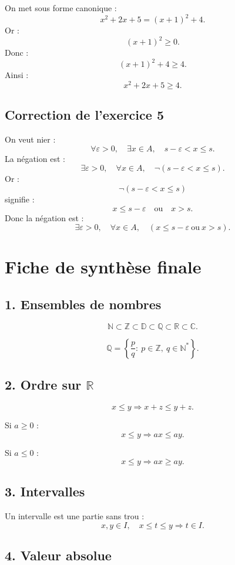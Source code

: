 \documentclass[11pt,a4paper]{article}
\newcommand{\N}{\mathbb N}
\newcommand{\Z}{\mathbb Z}
\newcommand{\D}{\mathbb D}
\newcommand{\Q}{\mathbb Q}
\newcommand{\R}{\mathbb R}
\newcommand{\C}{\mathbb C}
\newcommand{\implique}{\Longrightarrow}
\begin{document}
On met sous forme canonique :
\[
x^2+2x+5=(x+1)^2+4.
\]
Or :
\[
(x+1)^2\geq0.
\]
Donc :
\[
(x+1)^2+4\geq4.
\]
Ainsi :
\[
x^2+2x+5\geq4.
\]

\subsection*{Correction de l'exercice 5}

On veut nier :
\[
\forall \varepsilon>0,\quad \exists x\in A,\quad s-\varepsilon<x\leq s.
\]
La négation est :
\[
\exists \varepsilon>0,\quad \forall x\in A,\quad \neg(s-\varepsilon<x\leq s).
\]
Or :
\[
\neg(s-\varepsilon<x\leq s)
\]
signifie :
\[
x\leq s-\varepsilon
\quad\text{ou}\quad
x>s.
\]
Donc la négation est :
\[
\exists \varepsilon>0,\quad \forall x\in A,\quad
\left(x\leq s-\varepsilon\ \text{ou}\ x>s\right).
\]

\newpage
\section{Fiche de synthèse finale}

\subsection*{1. Ensembles de nombres}

\[
\N\subset\Z\subset\D\subset\Q\subset\R\subset\C.
\]

\[
\Q=\left\{\frac pq:\ p\in\Z,\ q\in\N^*\right\}.
\]

\subsection*{2. Ordre sur \(\R\)}

\[
x\leq y\implique x+z\leq y+z.
\]

Si \(a\geq0\) :
\[
x\leq y\implique ax\leq ay.
\]

Si \(a\leq0\) :
\[
x\leq y\implique ax\geq ay.
\]

\subsection*{3. Intervalles}

Un intervalle est une partie sans trou :
\[
x,y\in I,\quad x\leq t\leq y
\implique
t\in I.
\]

\subsection*{4. Valeur absolue}
\end{document}
